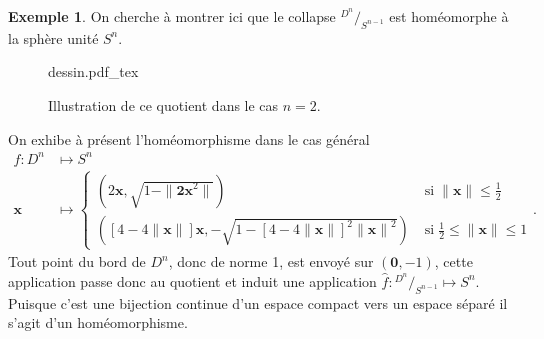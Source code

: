 \documentclass[12pt]{book}
\newcommand{\incfig}[1]{%
    \def\svgwidth{\columnwidth}
    {#1.pdf_tex} 
}
\theoremstyle{definition}
\newtheorem{example}[lemma]{Exemple}
\theoremstyle{remark}
\newcommand*\quot[2]{{^{\textstyle #1}\big/_{\textstyle #2}}}
\begin{document}
	\begin{example}
		On cherche à montrer ici que le collapse $\quot{D^n}{S^{n-1}}$ est homéomorphe à la sphère unité $S^n$.
		\begin{figure}[ht!]
			\centering
			\incfig{dessin}
			\caption{Illustration de ce quotient dans le cas $n=2$.}
		\end{figure}
		On exhibe à présent l'homéomorphisme dans le cas général
		\begin{align*}
			f : D^n &\longmapsto S^n \\
			\textbf{x} &\longmapsto \begin{cases}
				(2\textbf{x},\sqrt{1-\|\textbf{2x}^2\|}) \; &\text{si} \; \|\textbf{x}\| \le \frac{1}{2} \\
				([4-4\|\textbf{x}\|]\textbf{x},-\sqrt{1-{[4-4\|\textbf{x}\|]}^2{\|\textbf{x}\|}^2}) \; &\text{si} \; \frac{1}{2} \le \|\textbf{x}\| \le 1
			\end{cases}
		.\end{align*}
		Tout point du bord de $D^n$, donc de norme 1, est envoyé sur  $(\textbf{0},-1)$, cette application passe donc au quotient et induit une application $\hat{f} : \quot{D^n}{S^{n-1}} \longmapsto S^n$. Puisque c'est une bijection continue d'un espace compact vers un espace séparé il s'agit d'un homéomorphisme.
	\end{example}
\end{document}

